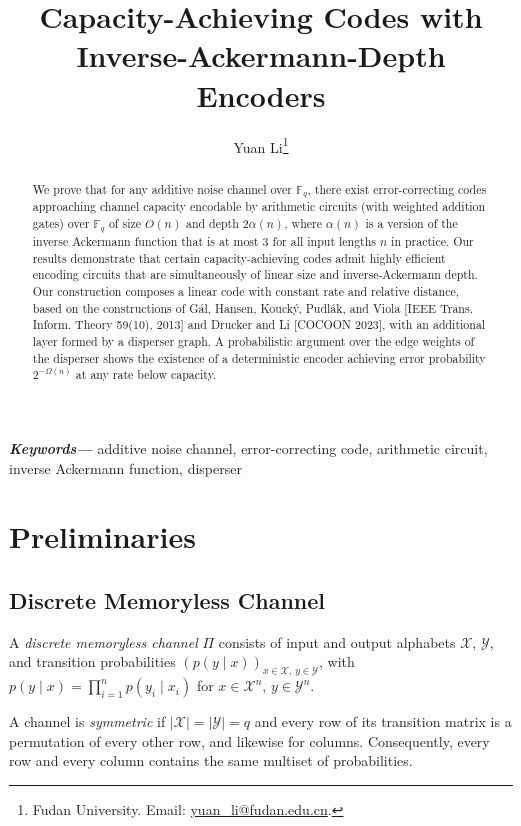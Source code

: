 \documentclass[11pt]{article}
\title{
Capacity-Achieving Codes with Inverse-Ackermann-Depth Encoders
}
\author{
Yuan Li\footnote{Fudan University.  Email: \href{mailto:yuan_li@fudan.edu.cn}{yuan\_li@fudan.edu.cn}.}
}
\date{}
\theoremstyle{named}
\providecommand{\keywords}[1]
{
  \textbf{\textit{Keywords---}} #1
}
\begin{document}
\maketitle

\begin{abstract}
We prove that for any additive noise channel over $\mathbb{F}_q$, there exist error-correcting codes approaching channel capacity encodable by arithmetic circuits (with weighted addition gates) over $\mathbb{F}_q$ of size $O(n)$ and depth $2\alpha(n)$, where $\alpha(n)$ is a version of the inverse Ackermann function that is at most $3$ for all input lengths $n$ in practice.
Our results demonstrate that certain capacity-achieving codes admit highly efficient encoding circuits that are simultaneously of linear size and inverse-Ackermann depth. 
Our construction composes a linear code with constant rate and relative distance, based on the constructions of G\'{a}l, Hansen, Kouck\'{y}, Pudl\'{a}k, and Viola [IEEE Trans. Inform. Theory 59(10), 2013] and Drucker and Li [COCOON 2023], with an additional layer formed by a disperser graph.
A probabilistic argument over the edge weights of the 
disperser shows the existence of a deterministic encoder achieving error probability $2^{-\Omega(n)}$ at any rate below capacity.
\end{abstract}

\keywords{additive noise channel, error-correcting code, arithmetic circuit, inverse Ackermann function, disperser}



\section{Preliminaries} \label{ch:prelim}

\subsection{Discrete Memoryless Channel}

A \emph{discrete memoryless channel} $\Pi$ consists of input and output alphabets $\mathcal{X}$, $\mathcal{Y}$, and transition probabilities $(p(y \mid x))_{x \in \mathcal{X},\, y \in \mathcal{Y}}$, with $p(y \mid x) = \prod_{i=1}^n p(y_i \mid x_i)$ for $x \in \mathcal{X}^n$, $y \in \mathcal{Y}^n$.

A channel is \emph{symmetric} if $|\mathcal{X}| = |\mathcal{Y}| = q$ and every row of its transition matrix is a permutation of every other row, and likewise for columns. Consequently, every row and every column contains the same multiset of probabilities.
\end{document}
